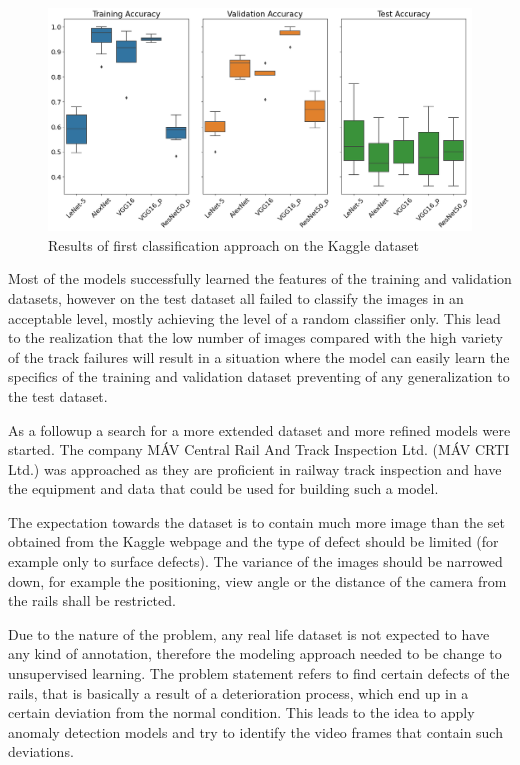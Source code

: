 \begin{figure}[!ht]
    \centering
    \includegraphics[width=\textwidth]{./tex_images/bootstrap_results.png}
    \caption{Results of first classification approach on the Kaggle dataset}
    \label{fig:Kaggle_results}
\end{figure}

Most of the models successfully learned the features of the training and validation datasets,
however on the test dataset all failed to classify the images in an acceptable level, mostly
achieving the level of a random classifier only.
This lead to the realization that the low number of images compared with the high variety of the track
failures will result in a situation where the model can easily learn the specifics of the training and
validation dataset preventing of any generalization to the test dataset.

As a followup a search for a more extended dataset and more refined models were started.
The company MÁV Central Rail And Track Inspection Ltd. (MÁV CRTI Ltd.) \cite{_mav_} was approached
as they are proficient in railway track inspection and have the equipment and data that could be used
for building such a model.

The expectation towards the dataset is to contain much more image than the set obtained from the
Kaggle webpage and the type of defect should be limited (for example only to surface defects).
The variance of the images should be narrowed down, for example the positioning, view angle or the
distance of the camera from the rails shall be restricted.

Due to the nature of the problem, any real life dataset is not expected to have any kind of annotation,
therefore the modeling approach needed to be change to unsupervised learning.
The problem statement refers to find certain defects of the rails, that is basically a result of a
deterioration process, which end up in a certain deviation from the normal condition.
This leads to the idea to apply anomaly detection models and try to identify the video frames
that contain such deviations.

